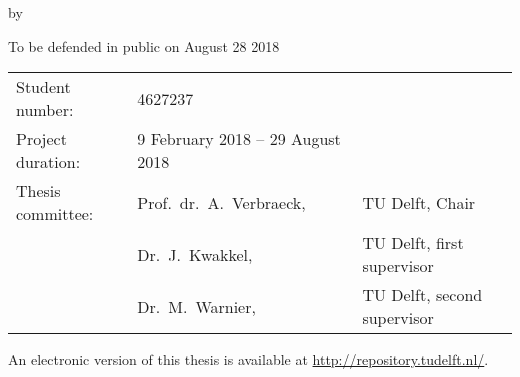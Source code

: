\begin{titlepage}
\begin{center}
{\large by}

\bigskip
\bigskip

\makeatletter
{\LARGE \@firstname{} \@lastname}
\makeatother

\bigskip
\bigskip

{\Large To be defended in public on August 28 2018}

\vfill

\end{center}

\thispagestyle{empty}

\medskip\noindent
\begin{tabularx}{\linewidth}{lll}
    Student number:     &   4627237                                                 & \\
    Project duration:   &   9 February 2018 -- 29 August 2018                       & \\
    Thesis committee:   &   Prof.\ dr.\ A.\ Verbraeck,                              & TU Delft, Chair \\
                        &   Dr.\ J.\ Kwakkel,                                       & TU Delft, first supervisor \\
                        &   Dr.\ M.\ Warnier,                                       & TU Delft, second supervisor \\
\end{tabularx}

\vspace{4\bigskipamount}

\medskip
\noindent An electronic version of this thesis is available at \url{http://repository.tudelft.nl/}.

\end{titlepage}

